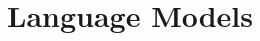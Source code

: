 \documentclass[conference]{IEEEtran}
\begin{document}






\section{Language Models} 
\label{section:lm}
\end{document}
